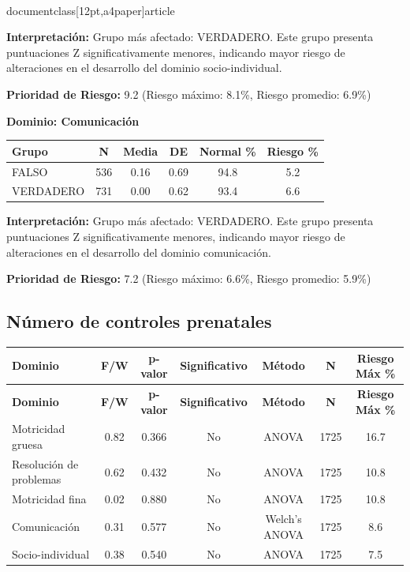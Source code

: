 \\documentclass[12pt,a4paper]{article}
\begin{document}
\textbf{Interpretación:} Grupo más afectado: VERDADERO. Este grupo presenta puntuaciones Z significativamente menores, indicando mayor riesgo de alteraciones en el desarrollo del dominio socio-individual.

\textbf{Prioridad de Riesgo:} 9.2 (Riesgo máximo: 8.1\%, Riesgo promedio: 6.9\%)


\vspace{0.5cm}


\textbf{Dominio: Comunicación}


\begin{center}
\begin{tabular}{|l|c|c|c|c|c|}
\hline
\textbf{Grupo} & \textbf{N} & \textbf{Media} & \textbf{DE} & \textbf{Normal \%} & \textbf{Riesgo \%} \\
\hline
FALSO & 536 & 0.16 & 0.69 & 94.8 & 5.2 \\
VERDADERO & 731 & 0.00 & 0.62 & 93.4 & 6.6 \\

\hline
\end{tabular}
\end{center}


\textbf{Interpretación:} Grupo más afectado: VERDADERO. Este grupo presenta puntuaciones Z significativamente menores, indicando mayor riesgo de alteraciones en el desarrollo del dominio comunicación.

\textbf{Prioridad de Riesgo:} 7.2 (Riesgo máximo: 6.6\%, Riesgo promedio: 5.9\%)


\vspace{0.5cm}


\subsection{Número de controles prenatales}


\begin{longtable}{|l|c|c|c|c|c|c|}
\hline
\textbf{Dominio} & \textbf{F/W} & \textbf{p-valor} & \textbf{Significativo} & \textbf{Método} & \textbf{N} & \textbf{Riesgo Máx \%} \\
\hline
\endfirsthead

\hline
\textbf{Dominio} & \textbf{F/W} & \textbf{p-valor} & \textbf{Significativo} & \textbf{Método} & \textbf{N} & \textbf{Riesgo Máx \%} \\
\hline
\endhead

\hline
\endfoot

\hline
\endlastfoot

Motricidad gruesa & 0.82 & 0.366 & No & ANOVA & 1725 & 16.7 \\
Resolución de problemas & 0.62 & 0.432 & No & ANOVA & 1725 & 10.8 \\
Motricidad fina & 0.02 & 0.880 & No & ANOVA & 1725 & 10.8 \\
Comunicación & 0.31 & 0.577 & No & Welch's ANOVA & 1725 & 8.6 \\
Socio-individual & 0.38 & 0.540 & No & ANOVA & 1725 & 7.5 \\

\end{longtable}
\end{document}
